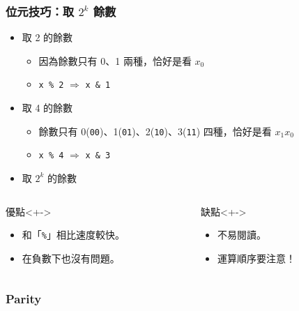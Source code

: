 \documentclass[utf8]{beamer}
\begin{document}
\begin{CJK}{UTF8}{bkai}
\begin{frame}[fragile]
  \frametitle{位元技巧：取 $2^k$ 餘數}
  \begin{itemize}[<+->]
  \item 取 2 的餘數
    \begin{itemize}
    \item 因為餘數只有 0、1 兩種，恰好是看 $x_0$
    \item \lstinline{x % 2}{} $\Rightarrow$ \lstinline{x & 1}{}
    \end{itemize}
  \item 取 4 的餘數
    \begin{itemize}
    \item 餘數只有 0(\lstinline{00}{})、1(\lstinline{01}{})、2(\lstinline{10}{})、3(\lstinline{11}{}) 四種，恰好是看 $x_1x_0$
    \item \lstinline{x % 4}{} $\Rightarrow$ \lstinline{x & 3}{} 
    \end{itemize}
  \item 取 $2^k$ 的餘數 
  \end{itemize}
  \begin{columns}[T]
    \begin{column}[T]{5cm}
    \begin{exampleblock}{優點}<+->
      \begin{itemize}
      \item 和「\lstinline{%}{}」相比速度較快。
      \item<+-> 在負數下也沒有問題。
      \end{itemize}
    \end{exampleblock}
    \end{column}
    \begin{column}[T]{5cm}
    \begin{alertblock}{缺點}<+->
      \begin{itemize}
      \item 不易閱讀。
      \item<+-> \alert{運算順序}要注意！
      \end{itemize}
    \end{alertblock}
    \end{column}
  \end{columns}
\end{frame}

\begin{frame}[fragile]
  \frametitle{Parity}
\end{frame}


\end{CJK}
\end{document}
